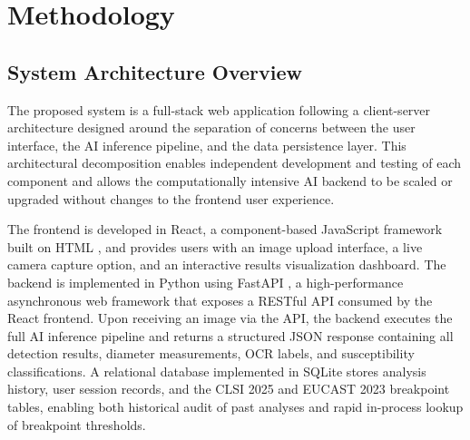 \chapter{Methodology}

\section{System Architecture Overview}

The proposed system is a full-stack web application following a client-server architecture
designed around the separation of concerns between the user interface, the AI inference
pipeline, and the data persistence layer. This architectural decomposition enables independent
development and testing of each component and allows the computationally intensive AI backend
to be scaled or upgraded without changes to the frontend user experience.

The frontend is developed in React, a component-based JavaScript framework built on HTML
\cite{sharma2018html,mozilla2025html}, and provides users with an image upload interface,
a live camera capture option, and an interactive results visualization dashboard. The backend
is implemented in Python \cite{siva2023python} using FastAPI \cite{tioman2024fastapi}, a high-performance asynchronous
web framework that exposes a RESTful API consumed by the React frontend.
 Upon
receiving an image via the API, the backend executes the full AI inference pipeline and returns
a structured JSON response containing all detection results, diameter measurements, OCR labels,
and susceptibility classifications. A relational database implemented in SQLite stores analysis
history, user session records, and the CLSI 2025 and EUCAST 2023 breakpoint tables, enabling
both historical audit of past analyses and rapid in-process lookup of breakpoint thresholds.

